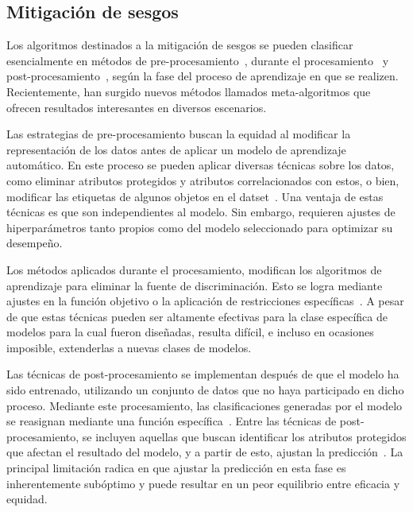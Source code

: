 \subsection{Mitigaci\'on de sesgos}

Los algoritmos destinados a la mitigaci\'on de sesgos se pueden clasificar esencialmente en m\'etodos de 
pre-procesamiento~\parencite{osti_10182459}, durante el procesamiento~\parencite{ml_in_admissions} y 
post-procesamiento~\parencite{compas}, seg\'un la fase del proceso de aprendizaje en que se realizen. Recientemente, 
han surgido nuevos m\'etodos llamados meta-algoritmos que ofrecen resultados interesantes en diversos escenarios.

Las estrategias de pre-procesamiento buscan la equidad al modificar la representaci\'on de los datos antes de aplicar un modelo de aprendizaje
autom\'atico. En este proceso se pueden aplicar diversas t\'ecnicas sobre los datos, como eliminar atributos protegidos y atributos correlacionados
con estos, o bien, modificar las etiquetas de algunos objetos en el datset~\parencite{preproc}. Una ventaja de estas t\'ecnicas es que son independientes
al modelo. Sin embargo, requieren ajustes de hiperpar\'ametros tanto propios como del modelo seleccionado para optimizar su desempe\~no.

Los m\'etodos aplicados durante el procesamiento, modifican los algoritmos de aprendizaje para eliminar la fuente de discriminaci\'on. Esto se 
logra mediante ajustes en la funci\'on objetivo o la aplicaci\'on de restricciones espec\'ificas~\parencite{donini2020empirical,zafar17a}. A pesar de 
que estas t\'ecnicas pueden ser altamente efectivas para la clase espec\'ifica de modelos para la cual fueron dise\~nadas, resulta dif\'icil, e 
incluso en ocasiones imposible, extenderlas a nuevas clases de modelos.

Las t\'ecnicas de post-procesamiento se implementan despu\'es de que el modelo ha sido entrenado, utilizando un conjunto de datos que no haya
participado en dicho proceso. Mediante este procesamiento, las clasificaciones generadas por el modelo se reasignan mediante una funci\'on 
espec\'ifica~\parencite{d_Alessandro_2017}.
Entre las t\'ecnicas de post-procesamiento, se incluyen aquellas que buscan identificar los atributos protegidos que afectan el resultado del 
modelo, y a partir de esto, ajustan la predicci\'on~\parencite{seymour2018bias}. La principal limitaci\'on radica en que ajustar la predicci\'on 
en esta fase es inherentemente sub\'optimo y puede resultar en un peor equilibrio entre eficacia y equidad.

